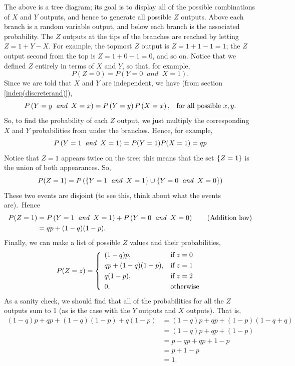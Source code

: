 The above is a tree diagram; its goal is to display all of the possible combinations of $X$ and $Y$ outputs, and hence to generate all possible $Z$ outputs. Above each branch is a random variable output, and below each branch is the associated probability. The $Z$ outputs at the tips of the branches are reached by letting $Z = 1 + Y - X$. For example, the topmost $Z$ output is $Z = 1 + 1 - 1 = 1$; the $Z$ output second from the top is $Z = 1 + 0 - 1 = 0$, and so on. Notice that we defined $Z$ entirely in terms of $X$ and $Y$, so that, for example,
\[
P(Z = 0) = P(Y = 0 \;\; \textit{and} \;\; X = 1).
\]
\noindent Since we are told that $X$ and $Y$ are independent, we have (from section \ref{indep(discreterand)}),
\[
P\left(Y = y \;\; \textit{and} \;\; X = x\right) = P\left(Y = y\right)P\left(X = x\right), \;\;\; \text{for all possible $x, y$.}
\]
So, to find the probability of each $Z$ output, we just multiply the corresponding $X$ and $Y$ probabilities from under the branches. Hence, for example,
\[
P\left(Y = 1 \;\; \textit{and} \;\; X = 1\right) = P(Y = 1)P(X = 1) = qp
\]
Notice that $Z = 1$ appears twice on the tree; this means that the set $\left\{Z = 1\right\}$ is the union of both appearances. So,
\[
P(Z = 1) = P\left(\left\{Y = 1 \;\; \textit{and} \;\; X = 1\right\} \cup \left\{Y = 0 \;\; \textit{and} \;\; X = 0\right\}\right)
\]
These two events are disjoint (to see this, think about what the events are).~Hence
\begin{align*}
P(Z = 1) & = P\left(Y = 1 \;\; \textit{and} \;\; X = 1\right) + P\left(Y = 0 \;\; \textit{and} \;\; X = 0\right) \tag{Addition law} \\
	      & = qp + (1-q)(1-p).
\end{align*}
Finally, we can make a list of possible $Z$ values and their probabilities,
\[
P(Z = z) = \left\{
  \begin{array}{ll}
    (1-q)p, & \text{if} \; z = 0 \smallskip \\
    qp + (1-q)(1-p), & \text{if} \; z = 1 \smallskip \\
    q(1-p), & \text{if} \; z = 2 \smallskip \\
    0, & \text{otherwise}
  \end{array}
\right.
\]
As a sanity check, we should find that all of the probabilities for all the $Z$ outputs sum to 1 (as is the case with the $Y$ outputs and $X$ outputs). That is,
\begin{align*}
 (1-q)p + qp + (1-q)(1-p) + q(1-p) & = (1-q)p + qp + (1-p)(1-q+q) \\
 						    & = (1-q)p + qp + (1-p) \\
 						    & = p - qp + qp + 1 - p \\
 						    & = p + 1 - p \\
 						    & = 1.
\end{align*}


